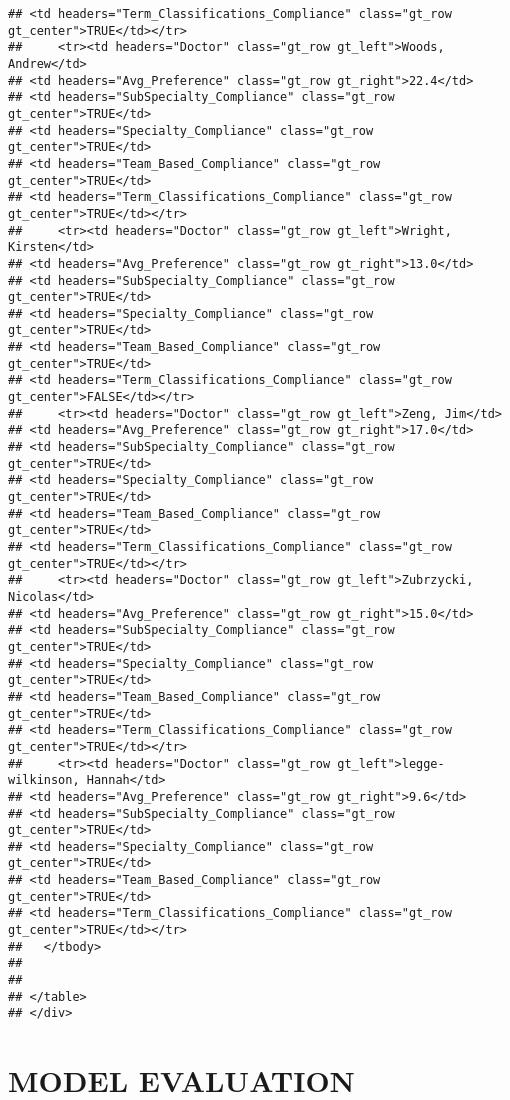 \documentclass[
]{article}
\begin{document}
\begin{verbatim}
## <td headers="Term_Classifications_Compliance" class="gt_row gt_center">TRUE</td></tr>
##     <tr><td headers="Doctor" class="gt_row gt_left">Woods, Andrew</td>
## <td headers="Avg_Preference" class="gt_row gt_right">22.4</td>
## <td headers="SubSpecialty_Compliance" class="gt_row gt_center">TRUE</td>
## <td headers="Specialty_Compliance" class="gt_row gt_center">TRUE</td>
## <td headers="Team_Based_Compliance" class="gt_row gt_center">TRUE</td>
## <td headers="Term_Classifications_Compliance" class="gt_row gt_center">TRUE</td></tr>
##     <tr><td headers="Doctor" class="gt_row gt_left">Wright, Kirsten</td>
## <td headers="Avg_Preference" class="gt_row gt_right">13.0</td>
## <td headers="SubSpecialty_Compliance" class="gt_row gt_center">TRUE</td>
## <td headers="Specialty_Compliance" class="gt_row gt_center">TRUE</td>
## <td headers="Team_Based_Compliance" class="gt_row gt_center">TRUE</td>
## <td headers="Term_Classifications_Compliance" class="gt_row gt_center">FALSE</td></tr>
##     <tr><td headers="Doctor" class="gt_row gt_left">Zeng, Jim</td>
## <td headers="Avg_Preference" class="gt_row gt_right">17.0</td>
## <td headers="SubSpecialty_Compliance" class="gt_row gt_center">TRUE</td>
## <td headers="Specialty_Compliance" class="gt_row gt_center">TRUE</td>
## <td headers="Team_Based_Compliance" class="gt_row gt_center">TRUE</td>
## <td headers="Term_Classifications_Compliance" class="gt_row gt_center">TRUE</td></tr>
##     <tr><td headers="Doctor" class="gt_row gt_left">Zubrzycki, Nicolas</td>
## <td headers="Avg_Preference" class="gt_row gt_right">15.0</td>
## <td headers="SubSpecialty_Compliance" class="gt_row gt_center">TRUE</td>
## <td headers="Specialty_Compliance" class="gt_row gt_center">TRUE</td>
## <td headers="Team_Based_Compliance" class="gt_row gt_center">TRUE</td>
## <td headers="Term_Classifications_Compliance" class="gt_row gt_center">TRUE</td></tr>
##     <tr><td headers="Doctor" class="gt_row gt_left">legge-wilkinson, Hannah</td>
## <td headers="Avg_Preference" class="gt_row gt_right">9.6</td>
## <td headers="SubSpecialty_Compliance" class="gt_row gt_center">TRUE</td>
## <td headers="Specialty_Compliance" class="gt_row gt_center">TRUE</td>
## <td headers="Team_Based_Compliance" class="gt_row gt_center">TRUE</td>
## <td headers="Term_Classifications_Compliance" class="gt_row gt_center">TRUE</td></tr>
##   </tbody>
##   
##   
## </table>
## </div>
\end{verbatim}

\hypertarget{model-evaluation}{%
\section{MODEL EVALUATION}\label{model-evaluation}}
\end{document}
